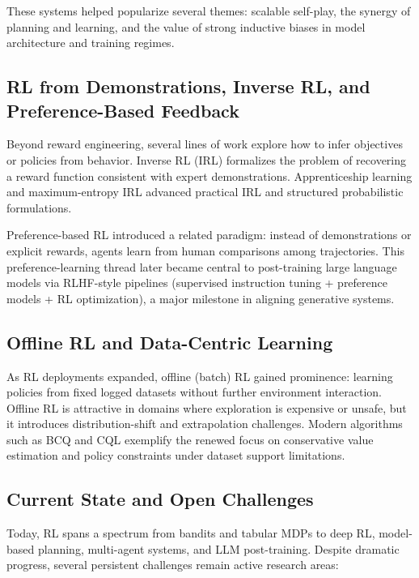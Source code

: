 \documentclass[10pt]{article}
\begin{document}
These systems helped popularize several themes: scalable self-play, the synergy of planning and learning, and the value of strong inductive biases in model architecture and training regimes.

\subsection{RL from Demonstrations, Inverse RL, and Preference-Based Feedback}

Beyond reward engineering, several lines of work explore how to infer objectives or policies from behavior.
Inverse RL (IRL) formalizes the problem of recovering a reward function consistent with expert demonstrations.\cite{ng2000irl}
Apprenticeship learning and maximum-entropy IRL advanced practical IRL and structured probabilistic formulations.\cite{abbeel2004apprenticeship,ziebart2008maxent}

Preference-based RL introduced a related paradigm: instead of demonstrations or explicit rewards, agents learn from human comparisons among trajectories.\cite{christiano2017preferences}
This preference-learning thread later became central to post-training large language models via RLHF-style pipelines (supervised instruction tuning + preference models + RL optimization), a major milestone in aligning generative systems.\cite{ouyang2022instructgpt}

\subsection{Offline RL and Data-Centric Learning}

As RL deployments expanded, offline (batch) RL gained prominence: learning policies from fixed logged datasets without further environment interaction.
Offline RL is attractive in domains where exploration is expensive or unsafe, but it introduces distribution-shift and extrapolation challenges.
Modern algorithms such as BCQ and CQL exemplify the renewed focus on conservative value estimation and policy constraints under dataset support limitations.\cite{fujimoto2019bcq,kumar2020cql}

\subsection{Current State and Open Challenges}

Today, RL spans a spectrum from bandits and tabular MDPs to deep RL, model-based planning, multi-agent systems, and LLM post-training.
Despite dramatic progress, several persistent challenges remain active research areas:
\end{document}
